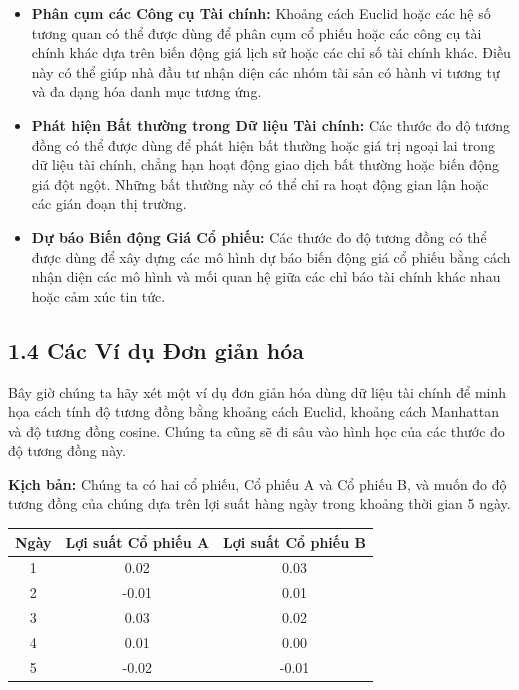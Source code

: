 \begin{itemize}
  \item \textbf{Phân cụm các Công cụ Tài chính:} Khoảng cách Euclid hoặc các hệ số tương quan có thể được dùng để phân cụm cổ phiếu hoặc các công cụ tài chính khác dựa trên biến động giá lịch sử hoặc các chỉ số tài chính khác. Điều này có thể giúp nhà đầu tư nhận diện các nhóm tài sản có hành vi tương tự và đa dạng hóa danh mục tương ứng.
  \item \textbf{Phát hiện Bất thường trong Dữ liệu Tài chính:} Các thước đo độ tương đồng có thể được dùng để phát hiện bất thường hoặc giá trị ngoại lai trong dữ liệu tài chính, chẳng hạn hoạt động giao dịch bất thường hoặc biến động giá đột ngột. Những bất thường này có thể chỉ ra hoạt động gian lận hoặc các gián đoạn thị trường.
  \item \textbf{Dự báo Biến động Giá Cổ phiếu:} Các thước đo độ tương đồng có thể được dùng để xây dựng các mô hình dự báo biến động giá cổ phiếu bằng cách nhận diện các mô hình và mối quan hệ giữa các chỉ báo tài chính khác nhau hoặc cảm xúc tin tức.
\end{itemize}

\subsection{1.4 Các Ví dụ Đơn giản hóa}

Bây giờ chúng ta hãy xét một ví dụ đơn giản hóa dùng dữ liệu tài chính để minh họa cách tính độ tương đồng bằng khoảng cách Euclid, khoảng cách Manhattan và độ tương đồng cosine. Chúng ta cũng sẽ đi sâu vào hình học của các thước đo độ tương đồng này.

\textbf{Kịch bản:} Chúng ta có hai cổ phiếu, Cổ phiếu A và Cổ phiếu B, và muốn đo độ tương đồng của chúng dựa trên lợi suất hàng ngày trong khoảng thời gian 5 ngày.

\begin{center}
\begin{tabular}{ccc}
\toprule
Ngày & Lợi suất Cổ phiếu A & Lợi suất Cổ phiếu B \\
\midrule
1 & 0.02 & 0.03 \\
2 & -0.01 & 0.01 \\
3 & 0.03 & 0.02 \\
4 & 0.01 & 0.00 \\
5 & -0.02 & -0.01 \\
\bottomrule
\end{tabular}
\end{center}

